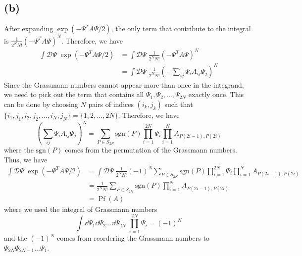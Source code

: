 \documentclass{article}
\begin{document}
\subsection*{(b)}
After expanding $\exp(-\Psi^T A\Psi/2)$, the only term that contribute to the integral is $\frac{1}{2^N N!}(-\Psi^T A \Psi)^N$.
Therefore, we have 
\begin{equation}
    \begin{split}
        \int\mathcal{D}\Psi \; \exp(-\Psi^T A \Psi/2)&=\int\mathcal{D}\Psi \; \frac{1}{2^N N!}(-\Psi^T A \Psi)^N\\
                                                   &=\int\mathcal{D}\Psi \; \frac{1}{2^N N!}\left(-\sum_{ij}\Psi_i A_{ij} \Psi_j\right)^N
    \end{split}
\end{equation}
Since the Grassmann numbers cannot appear more than once in the integrand, we need to pick out the term that contains all $\Psi_1, \Psi_2, \dots, \Psi_{2N}$ exactly once. This can be done by choosing $N$ pairs of indices $(i_k,j_k)$ such that $\{i_1,j_1,i_2,j_2,\dots,i_N,j_N\}=\{1,2,\dots,2N\}$. 
Therefore, we have
\begin{equation}
    \left(\sum_{ij}\Psi_i A_{ij} \Psi_j\right)^N = \sum_{P\in S_{2N}} \text{sgn}(P) \prod_{i=1}^{2N} \Psi_i \prod_{i=1}^N A_{P(2i-1),P(2i)}
\end{equation}
where the $\text{sgn}(P)$ comes from the permutation of the Grassmann numbers.
Thus, we have
\begin{equation}
    \begin{split}
        \int\mathcal{D}\Psi \; \exp(-\Psi^T A \Psi/2)&=\int\mathcal{D}\Psi \; \frac{1}{2^N N!}(-1)^N  \sum_{P\in S_{2N}} \text{sgn}(P) \prod_{i=1}^{2N} \Psi_i \prod_{i=1}^N A_{P(2i-1),P(2i)}\\
                                                   &=\frac{1}{2^N N!}\sum_{P\in S_{2N}} \text{sgn}(P) \prod_{i=1}^N A_{P(2i-1),P(2i)}\\
                                                   &=\operatorname{Pf}(A)
    \end{split}
\end{equation}
where we used the integral of Grassmann numbers 
\begin{equation}
    \int\dd{\Psi_1}\dd{\Psi_2}\dots\dd{\Psi_{2N}} \; \prod_{i=1}^{2N} \Psi_i = (-1)^N
\end{equation}
and the $(-1)^N$ comes from reordering the Grassmann numbers to $\Psi_{2N}\Psi_{2N-1}\dots\Psi_1$.




%
%
\end{document}
